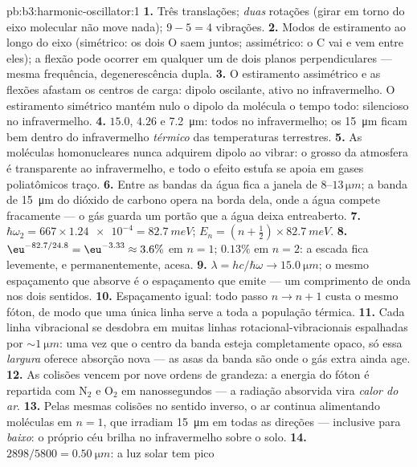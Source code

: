 \begin{solution}{pb:b3:harmonic-oscillator:1}
\textbf{1.} Três translações; \emph{duas} rotações (girar em torno do
eixo molecular não move nada); $9 - 5 = 4$ vibrações.
\textbf{2.} Modos de estiramento ao longo do eixo (simétrico: os dois O
saem juntos; assimétrico: o C vai e vem entre eles); a flexão pode
ocorrer em qualquer um de dois planos perpendiculares --- mesma
frequência, degenerescência dupla.
\textbf{3.} O estiramento assimétrico e as flexões afastam os centros
de carga: dipolo oscilante, ativo no infravermelho. O estiramento
simétrico mantém nulo o dipolo da molécula o tempo todo: silencioso no
infravermelho.
\textbf{4.} $15.0$, $4.26$ e \qty{7.2}{\micro m}: todos no
infravermelho; os \qty{15}{\micro m} ficam bem dentro do infravermelho
\emph{térmico} das temperaturas terrestres.
\textbf{5.} As moléculas homonucleares nunca adquirem dipolo ao vibrar:
o grosso da atmosfera é transparente ao infravermelho, e todo o efeito
estufa se apoia em gases poliatômicos traço.
\textbf{6.} Entre as bandas da água fica a janela de
$8$--$13\,\unit{\micro m}$; a banda de \qty{15}{\micro m} do dióxido de
carbono opera na borda dela, onde a água compete fracamente --- o gás
guarda um portão que a água deixa entreaberto.
\textbf{7.} $\hbar\omega_2 = 667 \times \num{1.24e-4} =
\qty{82.7}{meV}$; $E_n = (n + \tfrac12) \times \qty{82.7}{meV}$.
\textbf{8.} $\eu^{-82.7/24.8} = \eu^{-3.33} \approx 3.6\%$ em $n =
1$; $0.13\%$ em $n = 2$: a escada fica levemente, e permanentemente,
acesa.
\textbf{9.} $\lambda = hc/\hbar\omega \to \qty{15.0}{\micro m}$; o
mesmo espaçamento que absorve é o espaçamento que emite --- um
comprimento de onda nos dois sentidos.
\textbf{10.} Espaçamento igual: todo passo $n \to n + 1$ custa o mesmo
fóton, de modo que uma única linha serve a toda a população térmica.
\textbf{11.} Cada linha vibracional se desdobra em muitas linhas
rotacional-vibracionais espalhadas por $\sim\qty{1}{\micro m}$: uma vez
que o centro da banda esteja completamente opaco, só essa
\emph{largura} oferece absorção nova --- as asas da banda são onde o
gás extra ainda age.
\textbf{12.} As colisões vencem por nove ordens de grandeza: a energia
do fóton é repartida com N$_2$ e O$_2$ em nanossegundos --- a radiação
absorvida vira \emph{calor do ar}.
\textbf{13.} Pelas mesmas colisões no sentido inverso, o ar continua
alimentando moléculas em $n = 1$, que irradiam \qty{15}{\micro m} em
todas as direções --- inclusive para \emph{baixo}: o próprio céu brilha
no infravermelho sobre o solo.
\textbf{14.} $2898/5800 = \qty{0.50}{\micro m}$: a luz solar tem pico

\end{solution}
